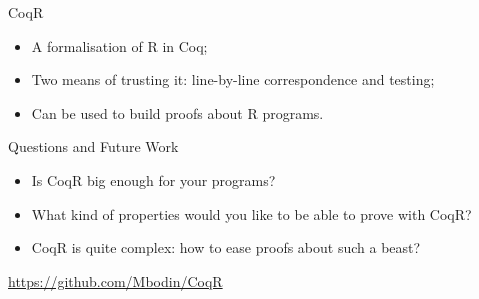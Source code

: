 \documentclass{beamer}
\begin{document}
\begin{frame}

    \begin{block}{CoqR}
    \begin{itemize}
        \item A formalisation of R in Coq;
        \item Two means of trusting it:
          line-by-line correspondence
          and testing;
        \item Can be used to build proofs about R programs.
    \end{itemize}
    \end{block}

    \begin{block}{Questions and Future Work}
    \begin{itemize}
        \item Is CoqR big enough for your programs?
        \item What kind of properties would you like to be able to prove with CoqR?
        \item CoqR is quite complex: how to ease proofs about such a beast?
    \end{itemize}
    \end{block}

    \begin{center}
        \url{https://github.com/Mbodin/CoqR}
    \end{center}

\end{frame}

\frame{\tableofcontents}


\end{document}
